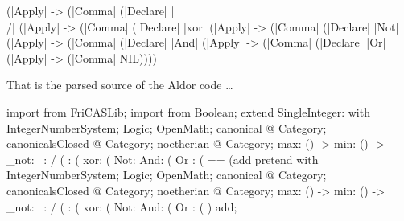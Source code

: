 \documentclass{article}
\begin{document}
\begin{code}
                                    (|Apply| -> (|Comma| %
                                   (|Declare| |\\/|
                                    (|Apply| -> (|Comma| %
                                   (|Declare| |xor|
                                    (|Apply| -> (|Comma| %
                                   (|Declare| |Not|
                                    (|Apply| -> (|Comma| %
                                   (|Declare| |And|
                                    (|Apply| -> (|Comma| %
                                   (|Declare| |Or|
                                    (|Apply| -> (|Comma| %
                   NIL))))
\end{code}
That is the parsed source of the Aldor code \ldots
\begin{code}
import from FriCASLib;
import from Boolean;
extend SingleInteger: with {
        IntegerNumberSystem;
        Logic;
        OpenMath;
        canonical @ Category;
        canonicalsClosed @ Category;
        noetherian @ Category;
        max: () -> %
        min: () -> %
        _not: %
        ~:   %
        /\:  (%
        \/:  (%
        xor: (%
        Not: %
        And: (%
        Or : (%
}
 == (add pretend with {
        IntegerNumberSystem;
        Logic;
        OpenMath;
        canonical @ Category;
        canonicalsClosed @ Category;
        noetherian @ Category;
        max: () -> %
        min: () -> %
        _not: %
        ~:   %
        /\:  (%
        \/:  (%
        xor: (%
        Not: %
        And: (%
        Or : (%
}) add;
\end{code}











\end{document}
